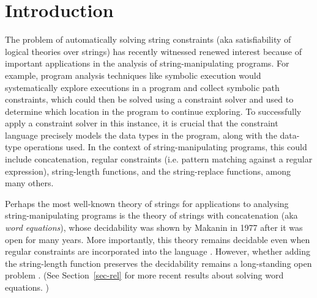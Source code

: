 
\section{Introduction}
\label{sec:intro}

The problem of %
automatically solving string constraints (aka satisfiability of logical theories over
strings) has recently witnessed renewed interest %
\cite{Berkeley-JavaScript,TCJ16,LB16,YABI14,S3,Abdulla14,Abdulla17,DV13,symbolic-transducer,BEK,HAMPI,cvc4,Z3-str,fang-yu-circuits,BTV09} 
because of important applications in the analysis of string-manipulating  programs. For example,
program analysis techniques like symbolic execution
\cite{king76,DART,EXE,jalangi} 
would
systematically explore executions in a program and collect symbolic path 
constraints, which could then be solved using a constraint solver and
used to determine which location in the program to continue exploring.
To successfully apply a constraint solver in this instance, it is
crucial that the constraint language precisely models the data types in the
program, along with the data-type operations used. In the context of
string-manipulating programs, this could include 
concatenation, regular constraints (i.e. pattern matching against a regular
expression), string-length functions, and the string-replace functions, among 
many others.

Perhaps the most well-known theory of strings for applications to analysing string-manipulating programs is the theory of strings with concatenation  (aka \emph{word equations}), whose decidability was shown by Makanin \cite{Makanin} in 1977 after it was open for many years. More importantly, 
this theory remains decidable even when regular constraints are incorporated into the 
language \cite{Schulz}. However, whether adding the string-length function
 preserves the decidability remains a long-standing open problem
\cite{Vijay-length,buchi}. (See Section~\ref{sec-rel} for more recent results about solving word equations. )

